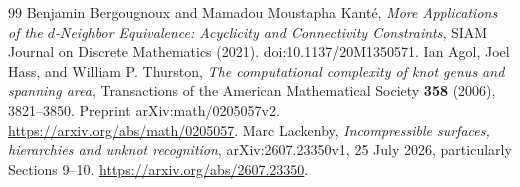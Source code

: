 \documentclass[11pt,letterpaper]{article}
\theoremstyle{definition}
\begin{document}
\begin{thebibliography}{99}
 Benjamin Bergougnoux and Mamadou Moustapha Kant\'e, \emph{More Applications of the $d$-Neighbor Equivalence: Acyclicity and Connectivity Constraints}, SIAM Journal on Discrete Mathematics (2021). doi:10.1137/20M1350571.
 Ian Agol, Joel Hass, and William P. Thurston, \emph{The computational complexity of knot genus and spanning area}, Transactions of the American Mathematical Society \textbf{358} (2006), 3821--3850. Preprint arXiv:math/0205057v2. \url{https://arxiv.org/abs/math/0205057}.
 Marc Lackenby, \emph{Incompressible surfaces, hierarchies and unknot recognition}, arXiv:2607.23350v1, 25 July 2026, particularly Sections 9--10. \url{https://arxiv.org/abs/2607.23350}.
\end{thebibliography}
\endgroup
\end{document}
